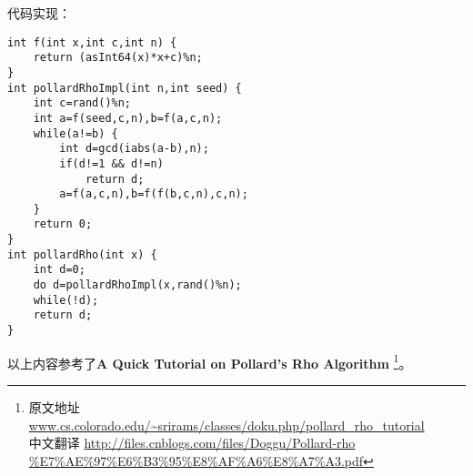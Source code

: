 代码实现：
\begin{lstlisting}[title=Pollard Rho]
int f(int x,int c,int n) {
    return (asInt64(x)*x+c)%n;
}
int pollardRhoImpl(int n,int seed) {
    int c=rand()%n;
    int a=f(seed,c,n),b=f(a,c,n);
    while(a!=b) {
        int d=gcd(iabs(a-b),n);
        if(d!=1 && d!=n)
            return d;
        a=f(a,c,n),b=f(f(b,c,n),c,n);
    }
    return 0;
}
int pollardRho(int x) {
    int d=0;
    do d=pollardRhoImpl(x,rand()%n);
    while(!d);
    return d;
}
\end{lstlisting}

以上内容参考了{\bfseries A Quick Tutorial on Pollard's Rho Algorithm}
\footnote{原文地址
\url{www.cs.colorado.edu/~srirams/classes/doku.php/pollard\_rho\_tutorial}
\\中文翻译
\url{http://files.cnblogs.com/files/Doggu/Pollard-rho
\%E7\%AE\%97\%E6\%B3\%95\%E8\%AF\%A6\%E8\%A7\%A3.pdf}
}。
